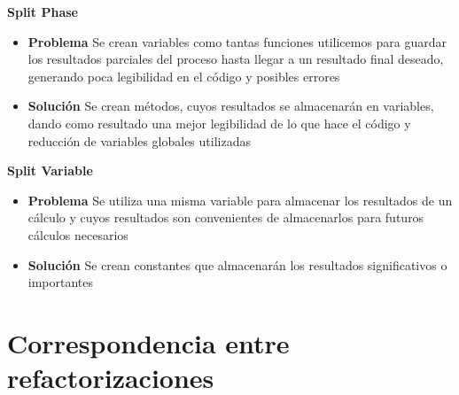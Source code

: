 \documentclass[11pt,a4paper,oneside]{book}
\begin{document}
\textbf{Split Phase}
\label{splitPhase}
\begin{itemize}
    \item \textbf{Problema} Se crean variables como tantas funciones utilicemos para guardar los resultados parciales del proceso hasta llegar a un resultado final deseado, generando poca legibilidad en el código y posibles errores 
    
    
    \item \textbf{Solución} Se crean métodos, cuyos resultados se almacenarán en variables, dando como resultado una mejor legibilidad de lo que hace el código y reducción de variables globales utilizadas
    
\end{itemize}

\textbf{Split Variable}
\label{splitVariable}
\begin{itemize}
    \item \textbf{Problema} Se utiliza una misma variable para almacenar los resultados de un cálculo y cuyos resultados son convenientes de almacenarlos para futuros cálculos necesarios 
    
    
    \item \textbf{Solución} Se crean constantes que almacenarán los resultados significativos o importantes
    
\end{itemize}

\chapter*{Correspondencia entre refactorizaciones}
\end{document}
